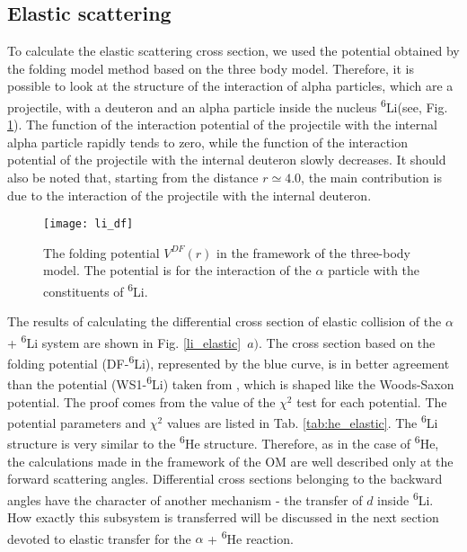 \documentclass[
12pt, %
oneside, %
english, %
onehalfspacing, %
onehalfspacing, %
headsepline, %
]{MastersDoctoralThesis} %
\newcommand{\he}{\textsuperscript{6}He\xspace}
\newcommand{\li}{\textsuperscript{6}Li\xspace}
\begin{document}
\subsection{Elastic scattering}

To calculate the elastic scattering cross section, we used the potential obtained by the folding model method based on the three body model. Therefore, it is possible to look at the structure of the interaction of alpha particles, which are a projectile, with a deuteron and an alpha particle inside the nucleus \li (see, Fig. \ref{li_df}). The function of the interaction potential of the projectile with the internal alpha particle rapidly tends to zero, while the function of the interaction potential of the projectile with the internal deuteron slowly decreases. It should also be noted that, starting from the distance $r \simeq 4.0$, the main contribution is due to the interaction of the projectile with the internal deuteron.

\begin{figure}[bp!]
\centering
\texttt{[image: li\_df]}
\decoRule
\caption{  \footnotesize  The folding potential $V^{DF}(r)$ in the framework of the three-body model. The potential is for the interaction of the $\alpha$ particle with the constituents of \li.
}
\label{li_df}
\end{figure}

The results of calculating the differential cross section of elastic collision of the $ \alpha $ + \li system are shown in Fig. \ref{li_elastic}~$a)$.
 The cross section based on the folding potential (DF-\li), represented by the blue curve, is in better agreement than the potential (WS1-\li) taken from \cite{oganessian1999dynamics}, which is shaped like the Woods-Saxon potential. 
 The proof comes from the value of the $\chi^2$ test for each potential. 
 The potential parameters and $\chi^2$ values are listed in Tab. \ref{tab:he_elastic}.
 The \li structure is very similar to the \he structure. Therefore, as in the case of \he, the calculations made in the framework of the OM are well described only at the forward scattering angles. 
 Differential cross sections belonging to the backward angles have the character of another mechanism - the transfer of $d$ inside \li. 
 How exactly this subsystem is transferred will be discussed in the next section devoted to elastic transfer for the $ \alpha$ + \he reaction.
\end{document}
